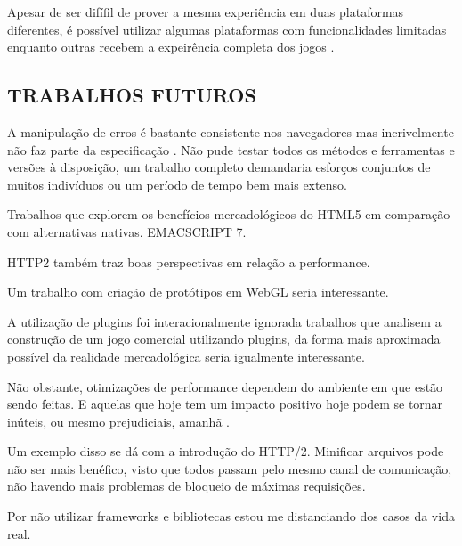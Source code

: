 Apesar de ser difífil de prover a mesma experiência em duas plataformas diferentes, é possível utilizar algumas plataformas com funcionalidades limitadas enquanto outras recebem a expeirência completa dos jogos \autocite[pp. 1]{currentStateCrossPlatform}.

\subsection{TRABALHOS FUTUROS}
A manipulação de erros é bastante consistente nos navegadores mas 
incrivelmente não faz parte da especificação \autocite{howBrowsersWork}.
Não pude testar todos os métodos e ferramentas e versões à
disposição, um trabalho completo demandaria esforços conjuntos de
muitos indivíduos ou um período de tempo bem mais extenso. 

Trabalhos que explorem os benefícios mercadológicos do HTML5 em comparação com alternativas nativas.
EMACSCRIPT 7.

HTTP2 também traz boas perspectivas em relação a performance.

Um trabalho com criação de protótipos em WebGL seria interessante.

A utilização de plugins foi interacionalmente ignorada trabalhos
que analisem a construção de um jogo comercial utilizando plugins,
da forma mais aproximada possível da realidade mercadológica seria
igualmente interessante.

Não obstante, otimizações de performance dependem do ambiente em
que estão sendo feitas. E aquelas que hoje tem um impacto positivo
hoje podem se tornar inúteis, ou mesmo prejudiciais, amanhã
\autocite[pp.131]{html5mostwanted}.

Um exemplo disso se dá com a introdução do HTTP/2. Minificar arquivos
pode não ser mais benéfico, visto que todos passam pelo mesmo canal
de comunicação, não havendo mais problemas de bloqueio de máximas
requisições.

Por não utilizar frameworks e bibliotecas estou me distanciando
dos casos da vida real.


